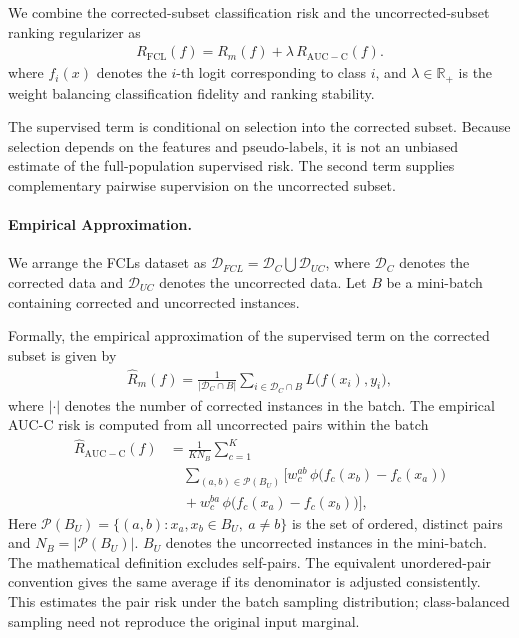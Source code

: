 \documentclass[10pt,twocolumn,letterpaper]{article}
\begin{document}
We combine the corrected-subset classification risk and the uncorrected-subset ranking regularizer as
\begin{equation}
\begin{aligned}
R_{\mathrm{FCL}}(f)=R_{m}(f)+\lambda\,R_{\mathrm{AUC-C}}(f).
\end{aligned}
\end{equation}
where $f_{i}(x)$ denotes the $i$-th logit corresponding to class $i$, and $\lambda\in\mathbb{R}_{+}$ is the weight balancing classification fidelity and ranking stability.

The supervised term is conditional on selection into the corrected subset. Because selection depends on the features and pseudo-labels, it is not an unbiased estimate of the full-population supervised risk. The second term supplies complementary pairwise supervision on the uncorrected subset.

\paragraph{Empirical Approximation.}
We arrange the FCLs dataset as $\mathcal{D}_{FCL}=\mathcal{D}_C \bigcup \mathcal{D}_{UC}$, where $\mathcal{D}_C$ denotes the corrected data and $\mathcal{D}_{UC}$ denotes the uncorrected data. Let $B$ be a mini-batch containing corrected and uncorrected instances.

Formally, the empirical approximation of the supervised term on the corrected subset is given by
\begin{equation}
\begin{aligned}
\widehat{R}_{m}(f)=\frac{1}{\lvert \mathcal D_{C}\cap B\rvert}\sum_{i\in \mathcal D_{C}\cap B}L\!\big(f(x_{i}),y_{i}\big),
\end{aligned}
\end{equation}
where $|\cdot|$ denotes the number of corrected instances in the batch. The empirical AUC-C risk is computed from all uncorrected pairs within the batch
\begin{equation}
\begin{aligned}
\widehat{R}_{\mathrm{AUC-C}}(f)
&=\frac{1}{K N_B}\sum_{c=1}^{K}\\
 &\quad\sum_{(a,b)\in\mathcal P(B_U)}\Big[
w_{c}^{ab}\,\phi\!\big(f_{c}(x_b)-f_{c}(x_a)\big)\\
&\quad+w_{c}^{ba}\,\phi\!\big(f_{c}(x_a)-f_{c}(x_b)\big)\Big],
\end{aligned}
\label{eq:AUC-C}
\end{equation}
Here $\mathcal P(B_U)=\{(a,b):x_a,x_b\in B_U,\ a\ne b\}$ is the set of ordered, distinct pairs and $N_B=|\mathcal P(B_U)|$. $B_U$ denotes the uncorrected instances in the mini-batch. The mathematical definition excludes self-pairs. The equivalent unordered-pair convention gives the same average if its denominator is adjusted consistently. This estimates the pair risk under the batch sampling distribution; class-balanced sampling need not reproduce the original input marginal.
\end{document}
